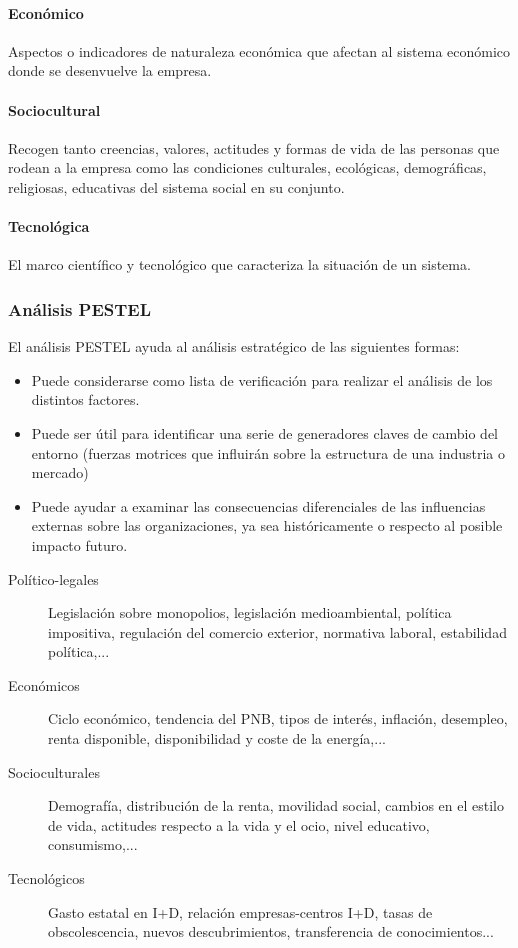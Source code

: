 \documentclass[12pt]{article}
\theoremstyle{definition_wo_parentheses}
\begin{document}
\paragraph{Económico} Aspectos o indicadores de naturaleza económica que afectan al sistema económico donde se desenvuelve la empresa.

\paragraph{Sociocultural} Recogen tanto creencias, valores, actitudes y formas de vida de las personas que rodean a la empresa como las condiciones culturales, ecológicas, demográficas, religiosas, educativas del sistema social en su conjunto.

\paragraph{Tecnológica} El marco científico y tecnológico que caracteriza la situación de un sistema.

\subsubsection{Análisis PESTEL}

El análisis PESTEL ayuda al análisis estratégico de las siguientes formas:

\begin{itemize}
\item Puede considerarse como lista de verificación para realizar el análisis de los distintos factores.
\item Puede ser útil para identificar una serie de generadores claves de cambio del entorno (fuerzas motrices que influirán sobre la estructura de una industria o mercado)
\item Puede ayudar a examinar las consecuencias diferenciales de las influencias externas sobre las organizaciones, ya sea históricamente o respecto al posible impacto futuro.
\end{itemize}

\begin{description}
\item[Político-legales] Legislación sobre monopolios, legislación medioambiental, política impositiva, regulación del comercio exterior, normativa laboral, estabilidad política,...
\item[Económicos] Ciclo económico, tendencia del PNB, tipos de interés, inflación, desempleo, renta disponible, disponibilidad y coste de la energía,...
\item[Socioculturales] Demografía, distribución de la renta, movilidad social, cambios en el estilo de vida, actitudes respecto a la vida y el ocio, nivel educativo, consumismo,...
\item[Tecnológicos] Gasto estatal en I+D, relación empresas-centros I+D, tasas de obscolescencia, nuevos descubrimientos, transferencia de conocimientos...
\end{description}
\end{document}
